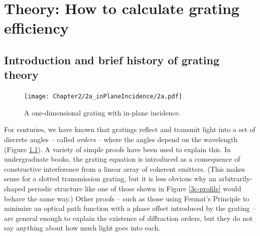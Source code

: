 \chapter{Theory: How to calculate grating efficiency}
\section{Introduction and brief history of grating theory}

\begin{figure}[htbp] %
   \centering
   \texttt{[image: Chapter2/2a\_inPlaneIncidence/2a.pdf]} 
   \caption{A one-dimensional grating with in-plane incidence.}
   \label{2a}
\end{figure}

For centuries, we have known that gratings reflect and transmit light into a set of discrete angles -- called \emph{orders} -- where the angles depend on the wavelength  (Figure \ref{2a}).  A variety of simple proofs have been used to explain this.  In undergraduate books, the grating equation is introduced as a consequence of constructive interference from a linear array of coherent emitters. (This makes sense for a slotted transmission grating, but it is less obvious why an arbitrarily-shaped periodic structure like one of those shown in Figure \ref{3c-profile} would behave the same way.)  Other proofs -- such as those using Fermat's Principle to minimize an optical path function with a phase offset introduced by the grating \cite[p.~93 -- 99]{Pea97} -- are general enough to explain the existence of diffraction orders, but they do not say anything about how much light goes into each.

